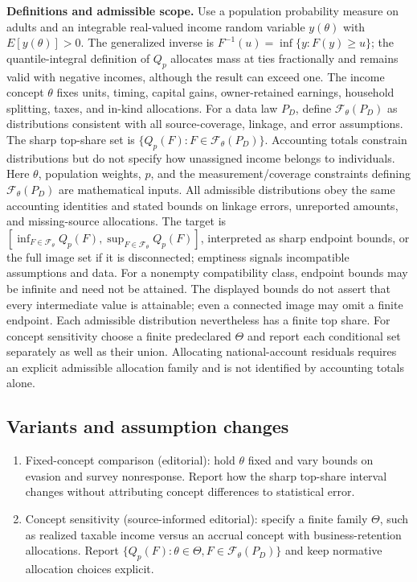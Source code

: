 \documentclass[11pt,a4paper]{article}
\begin{document}
\textbf{Definitions and admissible scope.} Use a population probability measure on adults and an integrable real-valued income random variable \(y(\theta)\) with \(E[y(\theta)]>0\). The generalized inverse is \(F^{-1}(u)=\inf\{y:F(y)\ge u\}\); the quantile-integral definition of \(Q_p\) allocates mass at ties fractionally and remains valid with negative incomes, although the result can exceed one. The income concept \(\theta\) fixes units, timing, capital gains, owner-retained earnings, household splitting, taxes, and in-kind allocations. For a data law \(P_D\), define \(\mathcal F_\theta(P_D)\) as distributions consistent with all source-coverage, linkage, and error assumptions. The sharp top-share set is \(\{Q_p(F):F\in\mathcal F_\theta(P_D)\}\). Accounting totals constrain distributions but do not specify how unassigned income belongs to individuals. Here \(\theta\), population weights, \(p\), and the measurement/coverage constraints defining \(\mathcal F_\theta(P_D)\) are mathematical inputs. All admissible distributions obey the same accounting identities and stated bounds on linkage errors, unreported amounts, and missing-source allocations. The target is \([\inf_{F\in\mathcal F_\theta}Q_p(F),\sup_{F\in\mathcal F_\theta}Q_p(F)]\), interpreted as sharp endpoint bounds, or the full image set if it is disconnected; emptiness signals incompatible assumptions and data. For a nonempty compatibility class, endpoint bounds may be infinite and need not be attained. The displayed bounds do not assert that every intermediate value is attainable; even a connected image may omit a finite endpoint. Each admissible distribution nevertheless has a finite top share. For concept sensitivity choose a finite predeclared \(\Theta\) and report each conditional set separately as well as their union. Allocating national-account residuals requires an explicit admissible allocation family and is not identified by accounting totals alone.
\subsection*{Variants and assumption changes}
\begin{enumerate}
\item Fixed-concept comparison (editorial): hold \(\theta\) fixed and vary bounds on evasion and survey nonresponse. Report how the sharp top-share interval changes without attributing concept differences to statistical error.
\item Concept sensitivity (source-informed editorial): specify a finite family \(\Theta\), such as realized taxable income versus an accrual concept with business-retention allocations. Report \(\{Q_p(F):\theta\in\Theta,F\in\mathcal F_\theta(P_D)\}\) and keep normative allocation choices explicit.
\end{enumerate}
\end{document}
